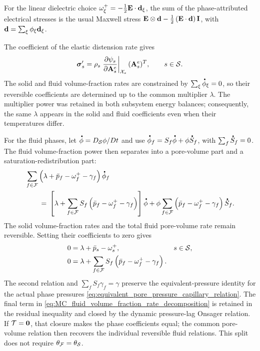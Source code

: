 For the linear dielectric choice
\(\omega^{+}_{\xi}=-\frac{1}{2}\mathbf{E}\cdot\mathbf{d}_\xi\), the sum of the
phase-attributed electrical stresses is the usual Maxwell stress
\(\mathbf{E}\otimes\mathbf{d}-\frac{1}{2}\left(\mathbf{E}\cdot\mathbf{d}\right)\mathbf{I}\), with
\(\mathbf{d}=\sum_\xi\phi_\xi\mathbf{d}_\xi\).

The coefficient of the elastic distension rate gives
%
\begin{equation}
	\boldsymbol{\sigma}_s'
	=
	\rho_s
	\left.
	\frac{\partial \psi_s}{\partial \mathbf{A}_s^e}
	\right\vert_{\mathcal{X}_s}
	(\mathbf{A}_s^e)^T,
	\qquad
	s\in\mathcal{S} .
	\label{eq:MC_distension_force_definition}
\end{equation}
%
The solid and fluid volume-fraction rates are constrained by
\(\sum_\xi\phasedot\phi_\xi=0\), so their reversible coefficients are determined up
to the common multiplier \(\lambda\).  The multiplier power was retained in
both subsystem energy balances; consequently, the same \(\lambda\) appears in
the solid and fluid coefficients even when their temperatures differ.

For the fluid phases, let
\(\phasedot\phi=D_{\mc S}\phi/Dt\) and use
\(\phasedot\phi_f=S_f\phasedot\phi+\phi\phasedot S_f\), with
\(\sum_f\phasedot S_f=0\).  The fluid volume-fraction power then separates into a
pore-volume part and a saturation-redistribution part:
%
\begin{align}
	&\sum_{f\in\mc F}
	\left(
	\lambda+\bar p_f-\omega_f^+-\gamma_f
	\right)\phasedot\phi_f
	\notag\\
	&\qquad={}
	\left[
	\lambda
	+\sum_{f\in\mc F}S_f
	\left(
	\bar p_f-\omega_f^+-\gamma_f
	\right)
	\right]\phasedot\phi
	+\phi\sum_{f\in\mc F}
	\left(
	\bar p_f-\omega_f^+-\gamma_f
	\right)\phasedot S_f .
	\label{eq:MC_fluid_volume_fraction_rate_decomposition}
\end{align}
%
The solid volume-fraction rates and the total fluid pore-volume rate remain
reversible.  Setting their coefficients to zero gives
%
\begin{subequations}
	\label{eq:MC_volume_fraction_restrictions}
	\begin{align}
		0
		      & =
		\lambda
		+
		\bar p_s
		-
		\omega^{+}_{s},
		\quad &
		s\in\mathcal{S},
		\label{eq:MC_solid_volume_fraction_restriction} \\
		0
		      & =
		\lambda
		+\sum_{f\in\mathcal{F}}S_f
		\left(
		\bar p_f-\omega_f^+-\gamma_f
		\right).
		\label{eq:MC_fluid_volume_fraction_restriction}
	\end{align}
\end{subequations}
%
The second relation and
\(\sum_fS_f\gamma_f=\gamma\) preserve the equivalent-pressure identity for the
actual phase pressures
\eqref{eq:equivalent_pore_pressure_capillary_relation}.  The final term in
\eqref{eq:MC_fluid_volume_fraction_rate_decomposition} is retained in the
residual inequality and closed by the dynamic pressure-lag Onsager relation.  If
\(\mathcal{T}=\mathbf{0}\), that closure makes the phase coefficients equal; the common
pore-volume relation then recovers the individual reversible fluid relations.
This split does not require \(\theta_{\mathcal{F}}=\theta_{\mathcal{S}}\).

